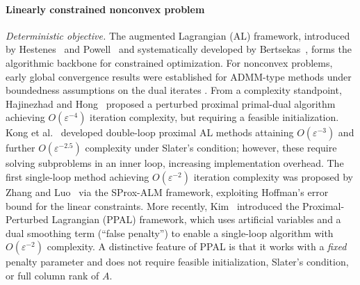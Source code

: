 \documentclass[10pt]{article}
\begin{document}
\paragraph{Linearly constrained nonconvex problem}


\emph{Deterministic objective.}
The augmented Lagrangian (AL) framework, introduced by Hestenes~\cite{hestenes1969} and 
Powell~\cite{powell1969} and systematically developed by Bertsekas~\cite{bertsekas2014}, 
forms the algorithmic backbone for constrained optimization.
For nonconvex problems, early global convergence results were established for ADMM-type 
methods under boundedness assumptions on the dual iterates 
\cite{wang2019admm,bote2019,li2020global}.
From a complexity standpoint, Hajinezhad and Hong~\cite{hajinezhad2019} proposed a 
perturbed proximal primal-dual algorithm achieving $O(\varepsilon^{-4})$ iteration 
complexity, but requiring a feasible initialization.
Kong et al.~\cite{kong2019,kong2020} developed double-loop proximal AL methods attaining 
$O(\varepsilon^{-3})$ and further $O(\varepsilon^{-2.5})$ complexity under Slater's 
condition; however, these require solving subproblems in an inner loop, increasing 
implementation overhead.
The first single-loop method achieving $O(\varepsilon^{-2})$ iteration complexity was 
proposed by Zhang and Luo~\cite{zhang2020proximal,zhang2022global} via the SProx-ALM 
framework, exploiting Hoffman's error bound for the linear constraints.
More recently, Kim~\cite{kim2023} introduced the Proximal-Perturbed Lagrangian (PPAL) 
framework, which uses artificial variables and a dual smoothing term (``false penalty'') 
to enable a single-loop algorithm with $O(\varepsilon^{-2})$ complexity.
A distinctive feature of PPAL is that it works with a \emph{fixed} penalty parameter 
and does not require feasible initialization, Slater's condition, or full column rank of $A$.
\end{document}
